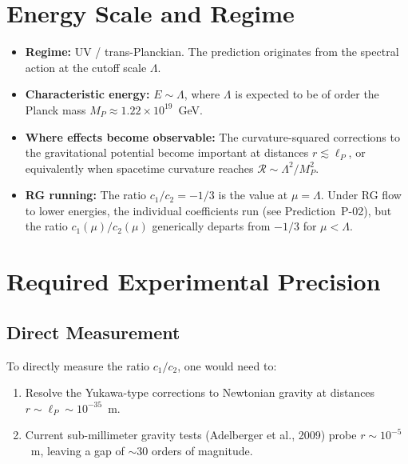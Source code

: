\documentclass[11pt,a4paper]{article}
\begin{document}
\section{Energy Scale and Regime}

\begin{itemize}[leftmargin=2em]
  \item \textbf{Regime:} UV / trans-Planckian. The prediction originates from the spectral action at the cutoff scale $\Lambda$.
  \item \textbf{Characteristic energy:} $E \sim \Lambda$, where $\Lambda$ is expected to be of order the Planck mass $M_P \approx 1.22 \times 10^{19}$~GeV.
  \item \textbf{Where effects become observable:} The curvature-squared corrections to the gravitational potential become important at distances $r \lesssim \ell_P$, or equivalently when spacetime curvature reaches $\mathcal{R} \sim \Lambda^2/M_P^2$.
  \item \textbf{RG running:} The ratio $c_1/c_2 = -1/3$ is the value at $\mu = \Lambda$. Under RG flow to lower energies, the individual coefficients run (see Prediction~P-02), but the ratio $c_1(\mu)/c_2(\mu)$ generically departs from $-1/3$ for $\mu < \Lambda$.
\end{itemize}

\section{Required Experimental Precision}

\subsection{Direct Measurement}

To directly measure the ratio $c_1/c_2$, one would need to:
\begin{enumerate}
  \item Resolve the Yukawa-type corrections to Newtonian gravity at distances $r \sim \ell_P \sim 10^{-35}$~m.
  \item Current sub-millimeter gravity tests (Adelberger et al., 2009) probe $r \sim 10^{-5}$~m, leaving a gap of $\sim 30$ orders of magnitude.
\end{enumerate}
\end{document}
